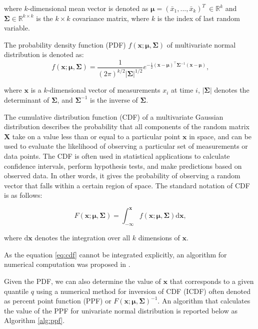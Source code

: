 where $k$-dimensional mean vector is denoted as \(\boldsymbol\mu = (\bar x_{1},...,\bar x_{k})^T\ \in \mathbb{R}^{k}\) and \(\boldsymbol\Sigma \in \mathbb{R}^{k\times{k}}\) is the $k \times k$ covariance matrix, where \(k\) is the index of last random variable.

The probability density function (PDF) \(f(\boldsymbol{x}; \boldsymbol{\mu}, \boldsymbol{\Sigma})\) of multivariate normal distribution is denoted as:
\begin{equation}
f(\boldsymbol{x}; \boldsymbol{\mu}, \boldsymbol{\Sigma}) = \frac{1}{(2\pi)^{k/2} |\boldsymbol{\Sigma}|^{1/2}} e^{-\frac{1}{2} (\boldsymbol{x}-\boldsymbol{\mu})^\top \boldsymbol{\Sigma}^{-1} (\boldsymbol{x}-\boldsymbol{\mu})}\text{,}
\end{equation}

where $\boldsymbol{x}$ is a $k$-dimensional vector of measurements $x_i$ at time $i$, $|\boldsymbol{\Sigma}|$ denotes the determinant of $\boldsymbol{\Sigma}$, and $\boldsymbol{\Sigma}^{-1}$ is the inverse of $\boldsymbol{\Sigma}$.

The cumulative distribution function (CDF) of a multivariate Gaussian distribution describes the probability that all components of the random matrix \(\boldsymbol{X}\) take on a value less than or equal to a particular point \(\boldsymbol{x}\) in space, and can be used to evaluate the likelihood of observing a particular set of measurements or data points. The CDF is often used in statistical applications to calculate confidence intervals, perform hypothesis tests, and make predictions based on observed data. In other words, it gives the probability of observing a random vector that falls within a certain region of space. The standard notation of CDF is as follows:

\begin{equation}
F(\boldsymbol{x}; \boldsymbol{\mu}, \boldsymbol{\Sigma}) = \int_{-\infty}^{\boldsymbol{x}} f(\boldsymbol{x}; \boldsymbol{\mu}, \boldsymbol{\Sigma}) \text{d}\boldsymbol{x}\text{,}\label{eq:cdf}
\end{equation}

where $\text{d}\boldsymbol{x}$ denotes the integration over all $k$ dimensions of $\boldsymbol{x}$.

As the equation \eqref{eq:cdf} cannot be integrated explicitly, an algorithm for numerical computation was proposed in \cite{Genz2000}.


Given the PDF, we can also determine the value of \(\boldsymbol{x}\) that corresponds to a given quantile $q$ using a numerical method for inversion of CDF (ICDF) often denoted as percent point function (PPF) or $F(\boldsymbol{x}; \boldsymbol{\mu}, \boldsymbol{\Sigma})^{-1}$. An algorithm that calculates the value of the PPF for univariate normal distribution is reported below as Algorithm \ref{alg:ppf}.

